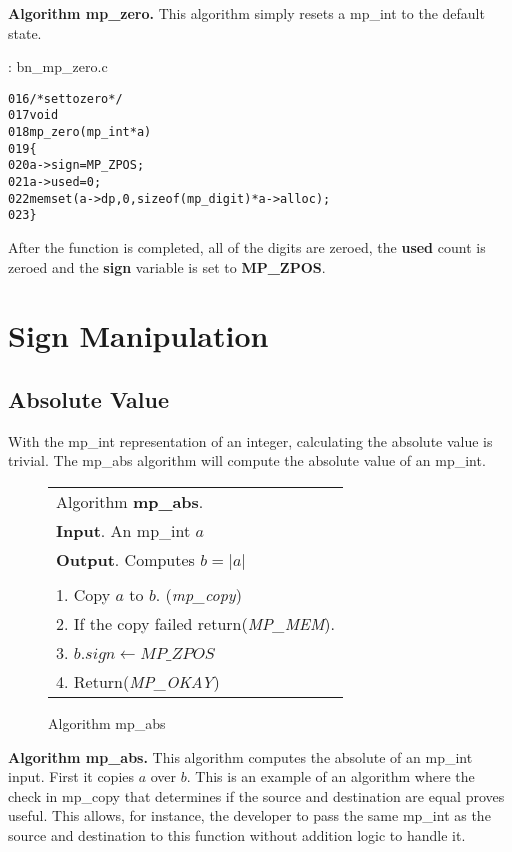 \documentclass[b5paper]{book}
\begin{document}
\textbf{Algorithm mp\_zero.}
This algorithm simply resets a mp\_int to the default state.  

\vspace{+3mm}\begin{small}
\hspace{-5.1mm}{\bf File}: bn\_mp\_zero.c
\vspace{-3mm}
\begin{alltt}
016   /* set to zero */
017   void
018   mp_zero (mp_int * a)
019   \{
020     a->sign = MP_ZPOS;
021     a->used = 0;
022     memset (a->dp, 0, sizeof (mp_digit) * a->alloc);
023   \}
\end{alltt}
\end{small}

After the function is completed, all of the digits are zeroed, the \textbf{used} count is zeroed and the 
\textbf{sign} variable is set to \textbf{MP\_ZPOS}.

\section{Sign Manipulation}
\subsection{Absolute Value}
With the mp\_int representation of an integer, calculating the absolute value is trivial.  The mp\_abs algorithm will compute
the absolute value of an mp\_int.

\newpage\begin{figure}[here]
\begin{center}
\begin{tabular}{l}
\hline Algorithm \textbf{mp\_abs}. \\
\textbf{Input}.   An mp\_int $a$ \\
\textbf{Output}.  Computes $b = \vert a \vert$ \\
\hline \\
1.  Copy $a$ to $b$.  (\textit{mp\_copy}) \\
2.  If the copy failed return(\textit{MP\_MEM}). \\
3.  $b.sign \leftarrow MP\_ZPOS$ \\
4.  Return(\textit{MP\_OKAY}) \\
\hline
\end{tabular}
\end{center}
\caption{Algorithm mp\_abs}
\end{figure}

\textbf{Algorithm mp\_abs.}
This algorithm computes the absolute of an mp\_int input.  First it copies $a$ over $b$.  This is an example of an
algorithm where the check in mp\_copy that determines if the source and destination are equal proves useful.  This allows,
for instance, the developer to pass the same mp\_int as the source and destination to this function without addition 
logic to handle it.
\end{document}
